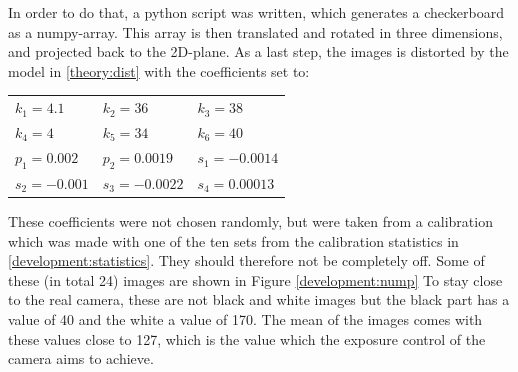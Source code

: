 In order to do that, a python script was written, which generates a checkerboard as a numpy-array.
This array is then translated and rotated in three dimensions, and projected back to the 2D-plane.
As a last step, the images is distorted by the model in \ref{theory:dist} with the coefficients set to:
\begin{center}
	\begin{tabular}{lll}
		$k_1 = 4.1$   &$k_2 = 36$     &$k_3 = 38$\\
		$k_4 = 4$     &$k_5 = 34$     &$k_6 = 40$\\
		$p_1 = 0.002$ &$p_2 = 0.0019$ &$s_1 = -0.0014$\\
		$s_2 = -0.001$&$s_3 = -0.0022$&$s_4 = 0.00013$	
	\end{tabular} 
\end{center}
These coefficients were not chosen randomly, but were taken from a calibration which was made with one of the ten sets from the calibration statistics in \ref{development:statistics}.
They should therefore not be completely off.
Some of these (in total 24) images are shown in Figure \ref{development:nump}
To stay close to the real camera, these are not black and white images but the black part has a value of 40 and the white a value of 170.
The mean of the images comes with these values close to 127, which is the value which the exposure control of the camera aims to achieve.
